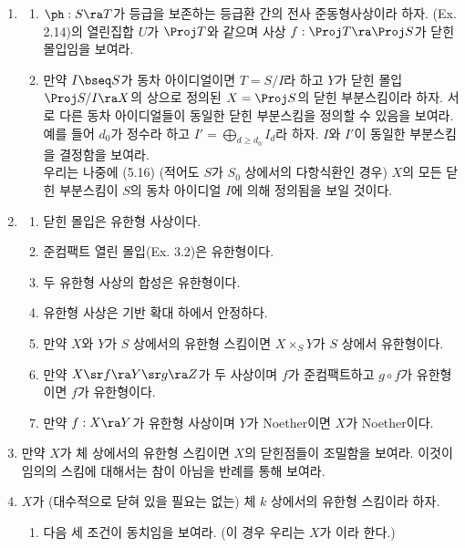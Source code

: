 \begin{enumerate}[label=\tb{3.\arabic*.},itemindent=0mm,itemsep=2mm]
	\item {}
	\begin{enumerate}[label=(\alph*)]
	\item $\ph:S\ra T$가 등급을 보존하는 등급환 간의 전사 준동형사상이라 하자.
	(Ex. 2.14)의 열린집합 $U$가 $\Proj T$와 같으며 사상 $f:\Proj T\ra\Proj S$가 닫힌 몰입임을 보여라.
	\item 만약 $I\bseq S$가 동차 아이디얼이면 $T=S/I$라 하고 $Y$가 닫힌 몰입 $\Proj S/I\ra X$의 상으로 정의된
	$X=\Proj S$의 닫힌 부분스킴이라 하자. 서로 다른 동차 아이디얼들이 동일한 닫힌 부분스킴을 정의할 수 있음을 보여라.
	예를 들어 $d_0$가 정수라 하고 $I'=\bigoplus_{d\ge d_0}I_d$라 하자. $I$와 $I'$이 동일한 부분스킴을 결정함을 보여라.\\
	우리는 나중에 (5.16) (적어도 $S$가 $S_0$ 상에서의 다항식환인 경우)
	$X$의 모든 닫힌 부분스킴이 $S$의 동차 아이디얼 $I$에 의해 정의됨을 보일 것이다.
	\end{enumerate}
	\item {}
	\begin{enumerate}[label=(\alph*)]
	\item 닫힌 몰입은 유한형 사상이다.
	\item 준컴팩트 열린 몰입(Ex. 3.2)은 유한형이다.
	\item 두 유한형 사상의 합성은 유한형이다.
	\item 유한형 사상은 기반 확대 하에서 안정하다.
	\item 만약 $X$와 $Y$가 $S$ 상에서의 유한형 스킴이면 $X\times_SY$가 $S$ 상에서 유한형이다.
	\item 만약 $X\sr f\ra Y\sr g\ra Z$가 두 사상이며 $f$가 준컴팩트하고 $g\circ f$가 유한형이면 $f$가 유한형이다.
	\item 만약 $f:X\ra Y$가 유한형 사상이며 $Y$가 Noether이면 $X$가 Noether이다.
	\end{enumerate}
	\item 만약 $X$가 체 상에서의 유한형 스킴이면 $X$의 닫힌점들이 조밀함을 보여라.
	이것이 임의의 스킴에 대해서는 참이 아님을 반례를 통해 보여라.
	\item $X$가 (대수적으로 닫혀 있을 필요는 없는) 체 $k$ 상에서의 유한형 스킴이라 하자.
	\begin{enumerate}[label=(\alph*)]
	\item 다음 세 조건이 동치임을 보여라. (이 경우 우리는 $X$가 이라 한다.)\\[-2mm]
	\begin{enumerate}[label=(\roman*)]

\end{enumerate}
\end{enumerate}
\end{enumerate}
